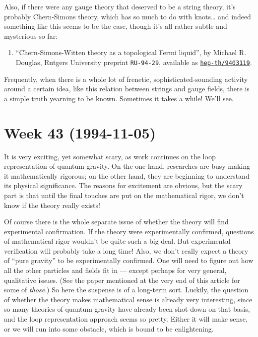 \documentclass{article}
\def\tightlist{}
\begin{document}
Also, if there were any gauge theory that deserved to be a string
theory, it's probably Chern-Simons theory, which has so much to do with
knots\ldots{} and indeed something like this seems to be the case,
though it's all rather subtle and mysterious so far:

\begin{enumerate}
\def\labelenumi{\arabic{enumi})}
\setcounter{enumi}{11}
\tightlist
\item
  ``Chern-Simons-Witten theory as a topological Fermi liquid'', by
  Michael R. Douglas, Rutgers University preprint \texttt{RU-94-29},
  available as
  \href{http://xxx.lanl.gov/abs/hep-th/9403119}{\texttt{hep-th/9403119}}.
\end{enumerate}

Frequently, when there is a whole lot of frenetic,
sophisticated-sounding activity around a certain idea, like this
relation between strings and gauge fields, there is a simple truth
yearning to be known. Sometimes it takes a while! We'll see.
\hypertarget{week-43-1994-11-05}{%
\section{Week 43 (1994-11-05)}\label{week-43-1994-11-05}}

It is very exciting, yet somewhat scary, as work continues on the loop
representation of quantum gravity. On the one hand, researches are busy
making it mathematically rigorous; on the other hand, they are beginning
to understand its physical significance. The reasons for excitement are
obvious, but the scary part is that until the final touches are put on
the mathematical rigor, we don't know if the theory really exists!

Of course there is the whole separate issue of whether the theory will
find experimental confirmation. If the theory were experimentally
confirmed, questions of mathematical rigor wouldn't be quite such a big
deal. But experimental verification will probably take a long time!
Also, we don't really expect a theory of ``pure gravity'' to be
experimentally confirmed. One will need to figure out how all the other
particles and fields fit in --- except perhaps for very general,
qualitative issues. (See the paper mentioned at the very end of this
article for some of \emph{those}.) So here the suspense is of a
long-term sort. Luckily, the question of whether the theory makes
mathematical sense is already very interesting, since so many theories
of quantum gravity have already been shot down on that basis, and the
loop representation approach seems so pretty. Either it will make sense,
or we will run into some obstacle, which is bound to be enlightening.
\end{document}
